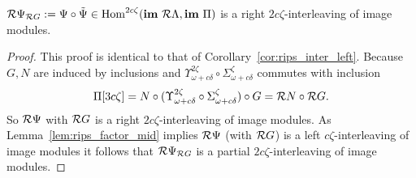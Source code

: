 \begin{corollary}\label{cor:rips_inter_right}
  $\mathcal{R} \Psi_{\mathcal{R} G} := \Psi\circ\tilde{\Psi}\in\mathrm{Hom}^{2c\zeta}(\mathbf{im}~\mathcal{R}\Lambda, \mathbf{im}~\Pi)$ is a right $2c\zeta$-interleaving of image modules.
\end{corollary}
\begin{proof}
  This proof is identical to that of Corollary~\ref{cor:rips_inter_left}.
  Because $G,N$ are induced by inclusions and $\Upsilon_{\omega+c\delta}^{2\zeta}\circ \Sigma_{\omega+c\delta}^{\zeta}$ commutes with inclusion
  \[\Pi[3c\zeta] = N\circ (\Upsilon_{\omega+c\delta}^{2\zeta}\circ \Sigma_{\omega+c\delta}^{\zeta})\circ G = \mathcal{R} N\circ \mathcal{R} G.\]
  So $\mathcal{R}\Psi$ with $\mathcal{R} G$ is a right $2c\zeta$-interleaving of image modules.
  As Lemma~\ref{lem:rips_factor_mid} implies $\mathcal{R} \Psi$ (with $\mathcal{R} G$) is a left $c\zeta$-interleaving of image modules it follows that $\mathcal{R} \Psi_{\mathcal{R} G}$ is a partial $2c\zeta$-interleaving of image modules.
\end{proof}
%
%

